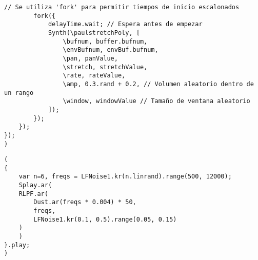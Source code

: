 \begin{minipage}[t]{1\textwidth}
\begin{lstlisting}[style=SuperCollider-IDE, basicstyle=\footnotesize\ttfamily, numbers=none]
        // Se utiliza 'fork' para permitir tiempos de inicio escalonados
        fork({
            delayTime.wait; // Espera antes de empezar
            Synth(\paulstretchPoly, [
                \bufnum, buffer.bufnum,
                \envBufnum, envBuf.bufnum,
                \pan, panValue,
                \stretch, stretchValue,
                \rate, rateValue,
                \amp, 0.3.rand + 0.2, // Volumen aleatorio dentro de un rango
                \window, windowValue // Tamaño de ventana aleatorio
            ]);
        });
    });
});
)                                 
    \end{lstlisting}
    \vspace{1cm}
\end{minipage}



















\begin{minipage}[t]{1\textwidth}
    \centering
    \begin{lstlisting}[style=SuperCollider-IDE, basicstyle=\footnotesize\ttfamily, numbers=none]
(
{
    var n=6, freqs = LFNoise1.kr(n.linrand).range(500, 12000);
    Splay.ar(
    RLPF.ar(
        Dust.ar(freqs * 0.004) * 50,
        freqs,
        LFNoise1.kr(0.1, 0.5).range(0.05, 0.15)
    )
    )
}.play;
)                                          
    \end{lstlisting}
    \vspace{1cm}
\end{minipage}
















